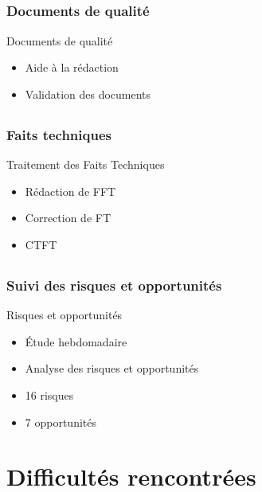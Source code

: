 \documentclass[compress,xcolor=dvipsnames]{beamer}
\begin{document}
\subsection{}
\begin{frame}
\frametitle{Documents de qualité}
\begin{block}{Documents de qualité}
\begin{itemize}
	\item Aide à la rédaction
	\item Validation des documents
\end{itemize}
\end{block}
\end{frame}


\subsection{}
\begin{frame}
\frametitle{Faits techniques}
\begin{block}{Traitement des Faits Techniques}
\begin{itemize}
	\item Rédaction de FFT
	\item Correction de FT
	\item CTFT
\end{itemize}
\end{block}
\end{frame}


\subsection{}
\begin{frame}
\frametitle{Suivi des risques et opportunités}
\begin{block}{Risques et opportunités}
\begin{itemize}
	\item Étude hebdomadaire
	\item Analyse des risques et opportunités
	\item 16 risques
	\item 7 opportunités
\end{itemize}
\end{block}
\end{frame}



\section{Difficultés rencontrées}
\end{document}
